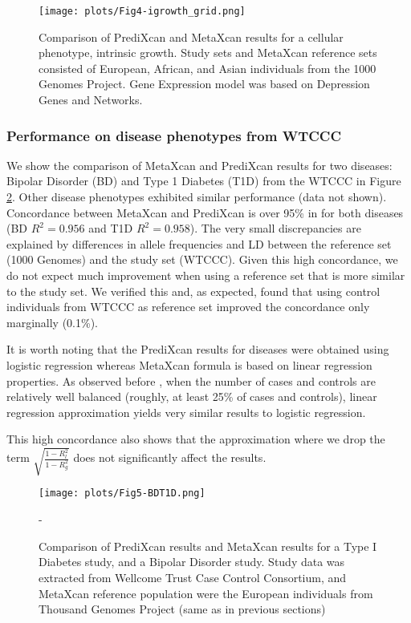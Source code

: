 \documentclass[10pt]{article}
\begin{document}
\begin{figure}
\texttt{[image: plots/Fig4-igrowth\_grid.png]}
\caption{Comparison of PrediXcan and MetaXcan results for a cellular phenotype, intrinsic growth. 
Study sets and MetaXcan reference sets consisted of European, African, and Asian
individuals from the 1000 Genomes Project. Gene Expression model was based on Depression Genes and Networks.}
\label{fig:igrowthgrid}
\end{figure}

\subsubsection*{Performance on disease phenotypes from WTCCC}

We show the comparison of MetaXcan and PrediXcan results for two diseases: Bipolar Disorder (BD) and Type 1 Diabetes (T1D) from the WTCCC in Figure \ref{fig:BDT1DMP}. Other disease phenotypes exhibited similar performance (data not shown). Concordance between MetaXcan and PrediXcan is over 95\% in for both diseases (BD $R^2=0.956$ and T1D $R^2=0.958$). The very small discrepancies are explained by differences in allele frequencies and LD between the reference set (1000 Genomes) and the study set (WTCCC). Given this high concordance, we do not expect much improvement when using a reference set that is more similar to the study set. We verified this and, as expected, found that using control individuals from WTCCC as reference set improved the concordance only marginally (0.1\%).

It is worth noting that the PrediXcan results for diseases were obtained using logistic regression whereas MetaXcan formula is based on linear regression properties. As observed before \cite{Zhou2013}, when the number of cases and controls are relatively well balanced (roughly, at least 25\% of cases and controls), linear regression approximation yields very similar results to logistic regression.

This high concordance also shows that the approximation where we drop the term $\sqrt{\frac{1-R_l^2}{1-R_g^2}}$ does not significantly affect the results.

\begin{figure}
\texttt{[image: plots/Fig5-BDT1D.png]}
\caption{Comparison of PrediXcan results and MetaXcan results for a Type I Diabetes study, and a Bipolar Disorder study.
Study data was extracted from Wellcome Trust Case Control Consortium,
and MetaXcan reference population were the European individuals from Thousand Genomes Project
(same as in previous sections) }
-\label{fig:BDT1DMP}
\end{figure}
\end{document}
